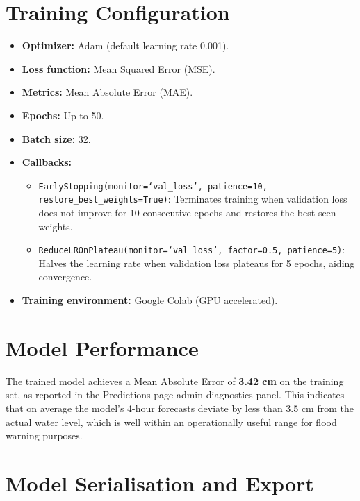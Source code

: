 \section{Training Configuration}

\begin{itemize}[leftmargin=1.5em]
  \item \textbf{Optimizer:} Adam (default learning rate 0.001).
  \item \textbf{Loss function:} Mean Squared Error (MSE).
  \item \textbf{Metrics:} Mean Absolute Error (MAE).
  \item \textbf{Epochs:} Up to 50.
  \item \textbf{Batch size:} 32.
  \item \textbf{Callbacks:}
    \begin{itemize}
      \item \texttt{EarlyStopping(monitor=`val\_\allowbreak{}loss',\allowbreak{} patience=10,\allowbreak{} restore\_\allowbreak{}best\_\allowbreak{}weights=True)}: Terminates training when validation loss does not improve for 10 consecutive epochs and restores the best-seen weights.
      \item \texttt{ReduceLROnPlateau(monitor=`val\_\allowbreak{}loss',\allowbreak{} factor=0.\allowbreak{}5,\allowbreak{} patience=5)}: Halves the learning rate when validation loss plateaus for 5 epochs, aiding convergence.
    \end{itemize}
  \item \textbf{Training environment:} Google Colab (GPU accelerated).
\end{itemize}

\section{Model Performance}

The trained model achieves a Mean Absolute Error of \textbf{3.42 cm} on the training set, as reported in the Predictions page admin diagnostics panel. This indicates that on average the model's 4-hour forecasts deviate by less than 3.5 cm from the actual water level, which is well within an operationally useful range for flood warning purposes.

\section{Model Serialisation and Export}

